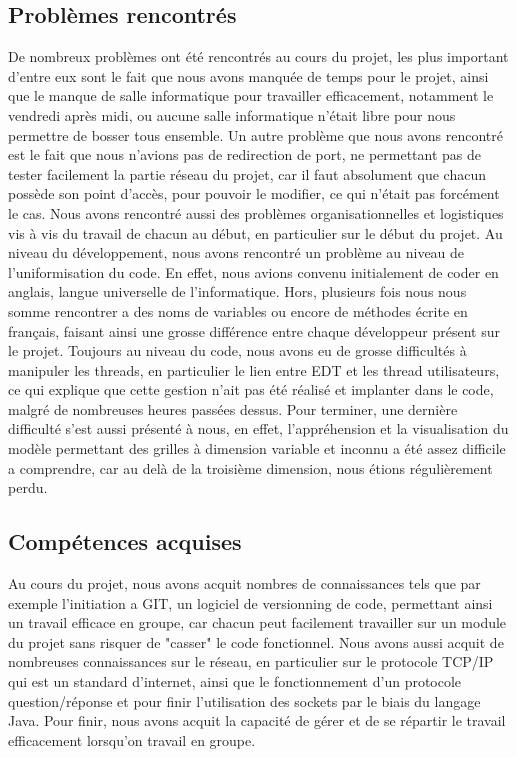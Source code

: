 \subsection{Problèmes rencontrés}
	De nombreux problèmes ont été rencontrés au cours du projet, les plus important d'entre eux sont le fait que nous avons manquée de temps pour le projet, ainsi que le manque de salle informatique pour travailler efficacement, notamment le vendredi après midi, ou aucune salle informatique n'était libre pour nous permettre de bosser tous ensemble.\newline
	Un autre problème que nous avons rencontré est le fait que nous n'avions pas de redirection de port, ne permettant pas de tester facilement la partie réseau du projet, car il faut absolument que chacun possède son point d'accès, pour pouvoir le modifier, ce qui n'était pas forcément le cas.\newline
	Nous avons rencontré aussi des problèmes organisationnelles et logistiques vis à vis du travail de chacun au début, en particulier sur le début du projet.\newline
	Au niveau du développement, nous avons rencontré un problème au niveau de l'uniformisation du code. En effet, nous avions convenu initialement de coder en anglais, langue universelle de l'informatique. Hors, plusieurs fois nous nous somme rencontrer a des noms de variables ou encore de méthodes écrite en français, faisant ainsi une grosse différence entre chaque développeur présent sur le projet.\newline
	Toujours au niveau du code, nous avons eu de grosse difficultés à manipuler les threads, en particulier le lien entre EDT et les thread utilisateurs, ce qui explique que cette gestion n'ait pas été réalisé et implanter dans le code, malgré de nombreuses heures passées dessus.\newline
	Pour terminer, une dernière difficulté s'est aussi présenté à nous, en effet, l'appréhension et la visualisation du modèle permettant des grilles à dimension variable et inconnu a été assez difficile a comprendre, car au delà de la troisième dimension, nous étions régulièrement perdu.

\subsection{Compétences acquises}
	Au cours du projet, nous avons acquit nombres de connaissances tels que par exemple l'initiation a GIT, un logiciel de versionning de code, permettant ainsi un travail efficace en groupe, car chacun peut facilement travailler sur un module du projet sans risquer de "casser" le code fonctionnel.\newline
	 Nous avons aussi acquit de nombreuses connaissances sur le réseau, en particulier sur le protocole TCP/IP qui est un standard d'internet, ainsi que le fonctionnement d'un protocole question/réponse et pour finir l'utilisation des sockets par le biais du langage Java.\newline
	 Pour finir, nous avons acquit la capacité de gérer et de se répartir le travail efficacement lorsqu'on travail en groupe.